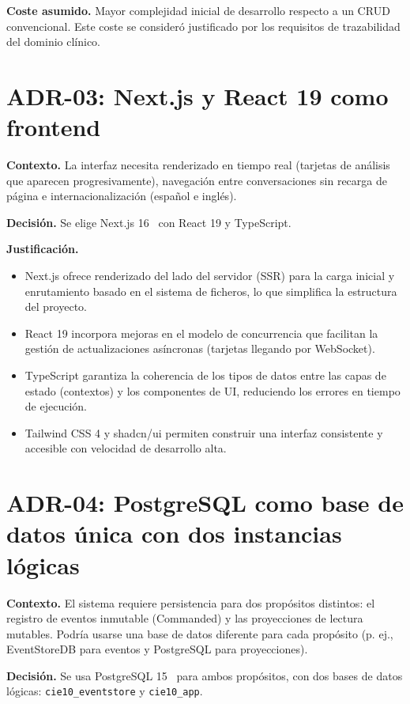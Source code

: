 \textbf{Coste asumido.} Mayor complejidad inicial de desarrollo respecto a un CRUD convencional. Este coste se consideró justificado por los requisitos de trazabilidad del dominio clínico.

\section{ADR-03: Next.js y React 19 como frontend}

\textbf{Contexto.} La interfaz necesita renderizado en tiempo real (tarjetas de análisis que aparecen progresivamente), navegación entre conversaciones sin recarga de página e internacionalización (español e inglés).

\textbf{Decisión.} Se elige Next.js 16~\cite{nextjs2024} con React 19 y TypeScript.

\textbf{Justificación.}
\begin{itemize}
    \item Next.js ofrece renderizado del lado del servidor (SSR) para la carga inicial y enrutamiento basado en el sistema de ficheros, lo que simplifica la estructura del proyecto.
    \item React 19 incorpora mejoras en el modelo de concurrencia que facilitan la gestión de actualizaciones asíncronas (tarjetas llegando por WebSocket).
    \item TypeScript garantiza la coherencia de los tipos de datos entre las capas de estado (contextos) y los componentes de UI, reduciendo los errores en tiempo de ejecución.
    \item Tailwind CSS 4 y shadcn/ui permiten construir una interfaz consistente y accesible con velocidad de desarrollo alta.
\end{itemize}

\section{ADR-04: PostgreSQL como base de datos única con dos instancias lógicas}

\textbf{Contexto.} El sistema requiere persistencia para dos propósitos distintos: el registro de eventos inmutable (Commanded) y las proyecciones de lectura mutables. Podría usarse una base de datos diferente para cada propósito (p. ej., EventStoreDB para eventos y PostgreSQL para proyecciones).

\textbf{Decisión.} Se usa PostgreSQL 15~\cite{postgresql2024} para ambos propósitos, con dos bases de datos lógicas: \texttt{cie10\_eventstore} y \texttt{cie10\_app}.

